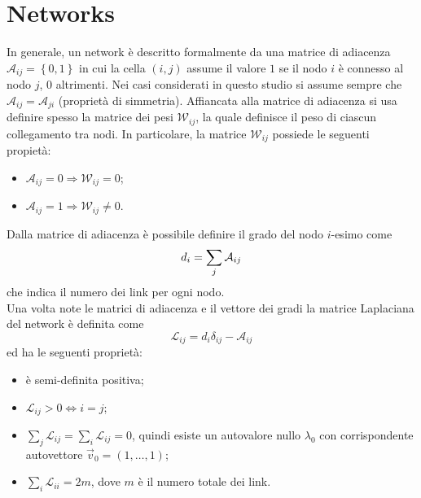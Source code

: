 \documentclass[../main.tex]{subfiles}
\begin{document}
\section{Networks}
In generale, un network \`e descritto formalmente da una matrice di adiacenza $\mathcal{A}_{ij}=\left\{0,1\right\}$ in cui la cella $(i,j)$ assume il valore $1$ se il nodo $i$ \`e connesso al nodo $j$, $0$ altrimenti.
Nei casi considerati in questo studio si assume sempre che $\mathcal{A}_{ij}=\mathcal{A}_{ji}$ (proprietà di simmetria).
Affiancata alla matrice di adiacenza si usa definire spesso la matrice dei pesi $\mathcal{W}_{ij}$, la quale definisce il peso di ciascun collegamento tra nodi.
In particolare, la matrice $\mathcal{W}_{ij}$ possiede le seguenti propiet\`a:
\begin{itemize}
    \item $\mathcal{A}_{ij} = 0 \Longrightarrow \mathcal{W}_{ij} = 0$;
    \item $\mathcal{A}_{ij} = 1 \Longrightarrow \mathcal{W}_{ij} \neq 0$.
\end{itemize}
Dalla matrice di adiacenza \`e possibile definire il grado del nodo $i$-esimo come
\begin{equation*}
    d_i=\sum_j\mathcal{A}_{ij}\\
\end{equation*}
che indica il numero dei link per ogni nodo.
\\Una volta note le matrici di adiacenza e il vettore dei gradi la matrice Laplaciana del network \`e definita come
\begin{equation}
    \mathcal{L}_{ij}=d_i\delta_{ij}-\mathcal{A}_{ij}
\end{equation}
ed ha le seguenti propriet\`a:
\begin{itemize}
    \item \`e semi-definita positiva;
    \item $\mathcal{L}_{ij}>0\Longleftrightarrow i=j$;
    \item $\sum_j\mathcal{L}_{ij}=\sum_i\mathcal{L}_{ij}=0$, quindi esiste un autovalore nullo $\lambda_0$ con corrispondente autovettore $\vec{v}_0=(1,\ldots,1)$;
    \item $\sum_i\mathcal{L}_{ii}=2m$, dove $m$ \`e il numero totale dei link.
\end{itemize}
\end{document}
